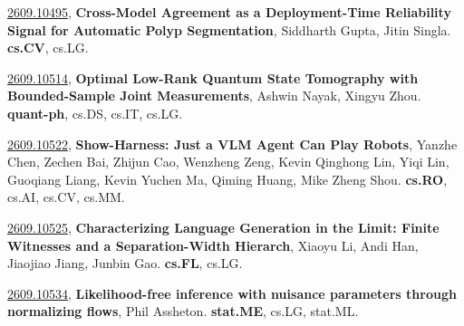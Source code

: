 \documentclass[9pt, a4paper]{article}
\theoremstyle{plain}
\theoremstyle{definition}
\theoremstyle{remark}
\newcommand{\arxivwithtarget}[3]{\hypertarget{#1}{}\href{https://arxiv.org/abs/#1}{#1}, \textbf{\textcolor{arxivblue}{#2}}, #3. }
\begin{document}
\arxivwithtarget{2609.10495}{Cross-Model Agreement as a Deployment-Time Reliability Signal for Automatic Polyp Segmentation}{Siddharth Gupta, Jitin Singla}\textbf{cs.CV}, cs.LG.



\arxivwithtarget{2609.10514}{Optimal Low-Rank Quantum State Tomography with Bounded-Sample Joint Measurements}{Ashwin Nayak, Xingyu Zhou}\textbf{quant-ph}, cs.DS, cs.IT, cs.LG.



\arxivwithtarget{2609.10522}{Show-Harness: Just a VLM Agent Can Play Robots}{Yanzhe Chen, Zechen Bai, Zhijun Cao, Wenzheng Zeng, Kevin Qinghong Lin, Yiqi Lin, Guoqiang Liang, Kevin Yuchen Ma, Qiming Huang, Mike Zheng Shou}\textbf{cs.RO}, cs.AI, cs.CV, cs.MM.



\arxivwithtarget{2609.10525}{Characterizing Language Generation in the Limit: Finite Witnesses and a Separation-Width Hierarch}{Xiaoyu Li, Andi Han, Jiaojiao Jiang, Junbin Gao}\textbf{cs.FL}, cs.LG.



\arxivwithtarget{2609.10534}{Likelihood-free inference with nuisance parameters through normalizing flows}{Phil Assheton}\textbf{stat.ME}, cs.LG, stat.ML.



    

\end{document}
